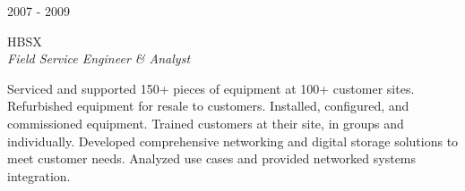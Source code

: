 \documentclass[10pt]{article} %
\begin{document}
\begin{minipage}[t]{0.5\textwidth}


{\raggedleft\textsc{2007 - 2009}\par}

{\raggedright\large\textsc{HBSX}\\
\textit{Field Service Engineer \& Analyst}\\[5pt]}

\normalsize{Serviced and supported 150+ pieces of equipment at 100+ customer sites. Refurbished equipment for resale to customers. Installed, configured, and commissioned equipment. Trained customers at their site, in groups and individually. Developed comprehensive networking and digital storage solutions to meet customer needs. Analyzed use cases and provided networked systems integration.}
\smallskip








\end{minipage}
\end{document}
